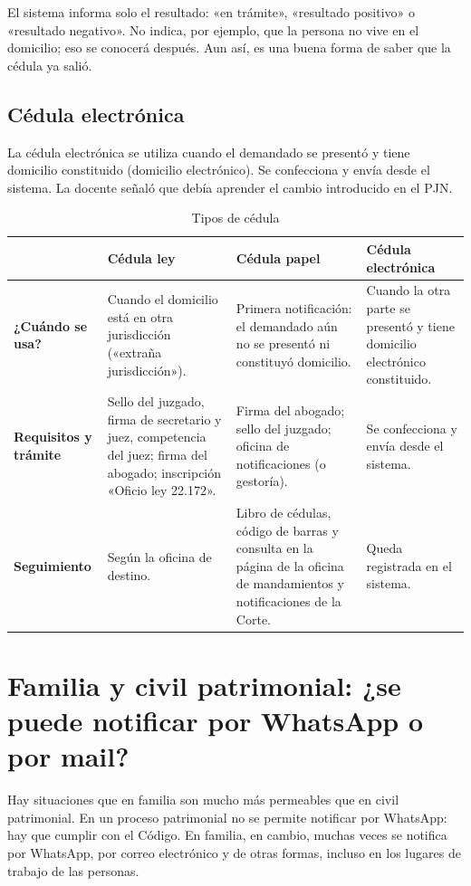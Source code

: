 \documentclass[12pt,oneside]{book}
\begin{document}
El sistema informa solo el resultado: «en trámite», «resultado positivo» o «resultado negativo». No indica, por ejemplo, que la persona no vive en el domicilio; eso se conocerá después. Aun así, es una buena forma de saber que la cédula ya salió.

\subsection{Cédula electrónica}

La cédula electrónica se utiliza cuando el demandado se presentó y tiene domicilio constituido (domicilio electrónico). Se confecciona y envía desde el sistema. La docente señaló que debía aprender el cambio introducido en el PJN.

\begin{table}[H]
\centering
\caption{Tipos de cédula}
\begin{tabularx}{\textwidth}{L{0.16\textwidth} Y Y Y}
\toprule
 & \textbf{Cédula ley} & \textbf{Cédula papel} & \textbf{Cédula electrónica} \\
\midrule
\textbf{¿Cuándo se usa?} & Cuando el domicilio está en otra jurisdicción («extraña jurisdicción»). & Primera notificación: el demandado aún no se presentó ni constituyó domicilio. & Cuando la otra parte se presentó y tiene domicilio electrónico constituido. \\
\addlinespace
\textbf{Requisitos y trámite} & Sello del juzgado, firma de secretario y juez, competencia del juez; firma del abogado; inscripción «Oficio ley 22.172». & Firma del abogado; sello del juzgado; oficina de notificaciones (o gestoría). & Se confecciona y envía desde el sistema. \\
\addlinespace
\textbf{Seguimiento} & Según la oficina de destino. & Libro de cédulas, código de barras y consulta en la página de la oficina de mandamientos y notificaciones de la Corte. & Queda registrada en el sistema. \\
\bottomrule
\end{tabularx}
\end{table}

\section{Familia y civil patrimonial: ¿se puede notificar por WhatsApp o por mail?}

Hay situaciones que en familia son mucho más permeables que en civil patrimonial. En un proceso patrimonial no se permite notificar por WhatsApp: hay que cumplir con el Código. En familia, en cambio, muchas veces se notifica por WhatsApp, por correo electrónico y de otras formas, incluso en los lugares de trabajo de las personas.
\end{document}
